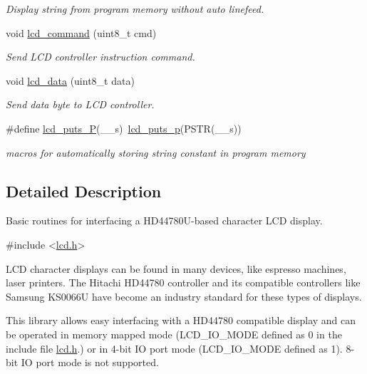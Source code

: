 \begin{DoxyCompactItemize}
\begin{DoxyCompactList}\small\item\em Display string from program memory without auto linefeed. \end{DoxyCompactList}\item 
void \hyperlink{group__pfleury__lcd_gaea9d14f02df06f948cb5a56776980826}{lcd\+\_\+command} (uint8\+\_\+t cmd)
\begin{DoxyCompactList}\small\item\em Send L\+CD controller instruction command. \end{DoxyCompactList}\item 
void \hyperlink{group__pfleury__lcd_gad0729d2cba627825a089ca1fff12ba29}{lcd\+\_\+data} (uint8\+\_\+t data)
\begin{DoxyCompactList}\small\item\em Send data byte to L\+CD controller. \end{DoxyCompactList}\item 
\mbox{\label{group__pfleury__lcd_ga4f1928f1515e21422d5a33af2949f2f7}} 
\#define \hyperlink{group__pfleury__lcd_ga4f1928f1515e21422d5a33af2949f2f7}{lcd\+\_\+puts\+\_\+P}(\+\_\+\+\_\+s)~\hyperlink{group__pfleury__lcd_ga9022a24a56a9b15681f62eb6ba77e5de}{lcd\+\_\+puts\+\_\+p}(P\+S\+TR(\+\_\+\+\_\+s))
\begin{DoxyCompactList}\small\item\em macros for automatically storing string constant in program memory \end{DoxyCompactList}\end{DoxyCompactItemize}


\subsection{Detailed Description}
Basic routines for interfacing a H\+D44780\+U-\/based character L\+CD display. 


\begin{DoxyCode}
\textcolor{preprocessor}{#include <\hyperlink{lcd_8h}{lcd.h}>} 
\end{DoxyCode}


L\+CD character displays can be found in many devices, like espresso machines, laser printers. The Hitachi H\+D44780 controller and its compatible controllers like Samsung K\+S0066U have become an industry standard for these types of displays.

This library allows easy interfacing with a H\+D44780 compatible display and can be operated in memory mapped mode (L\+C\+D\+\_\+\+I\+O\+\_\+\+M\+O\+DE defined as 0 in the include file \hyperlink{lcd_8h}{lcd.\+h}.) or in 4-\/bit IO port mode (L\+C\+D\+\_\+\+I\+O\+\_\+\+M\+O\+DE defined as 1). 8-\/bit IO port mode is not supported.

